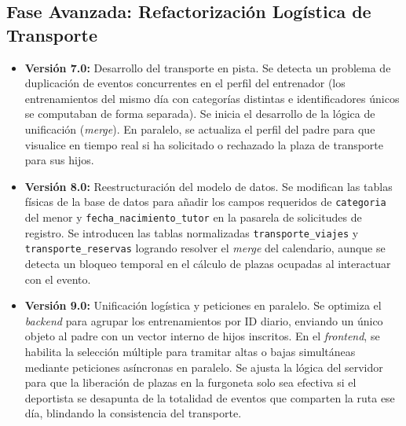     \subsection{Fase Avanzada: Refactorización Logística de Transporte}
    \begin{itemize}
        \item \textbf{Versión 7.0:} Desarrollo del transporte en pista. Se detecta un problema de duplicación de eventos concurrentes en el perfil del entrenador (los entrenamientos del mismo día con categorías distintas e identificadores únicos se computaban de forma separada). Se inicia el desarrollo de la lógica de unificación (\textit{merge}). En paralelo, se actualiza el perfil del padre para que visualice en tiempo real si ha solicitado o rechazado la plaza de transporte para sus hijos.
        \item \textbf{Versión 8.0:} Reestructuración del modelo de datos. Se modifican las tablas físicas de la base de datos para añadir los campos requeridos de \texttt{categoria} del menor y \texttt{fecha\_nacimiento\_tutor} en la pasarela de solicitudes de registro. Se introducen las tablas normalizadas \texttt{transporte\_viajes} y \texttt{transporte\_reservas} logrando resolver el \textit{merge} del calendario, aunque se detecta un bloqueo temporal en el cálculo de plazas ocupadas al interactuar con el evento.
        \item \textbf{Versión 9.0:} Unificación logística y peticiones en paralelo. Se optimiza el \textit{backend} para agrupar los entrenamientos por ID diario, enviando un único objeto al padre con un vector interno de hijos inscritos. En el \textit{frontend}, se habilita la selección múltiple para tramitar altas o bajas simultáneas mediante peticiones asíncronas en paralelo. Se ajusta la lógica del servidor para que la liberación de plazas en la furgoneta solo sea efectiva si el deportista se desapunta de la totalidad de eventos que comparten la ruta ese día, blindando la consistencia del transporte.
    \end{itemize}

